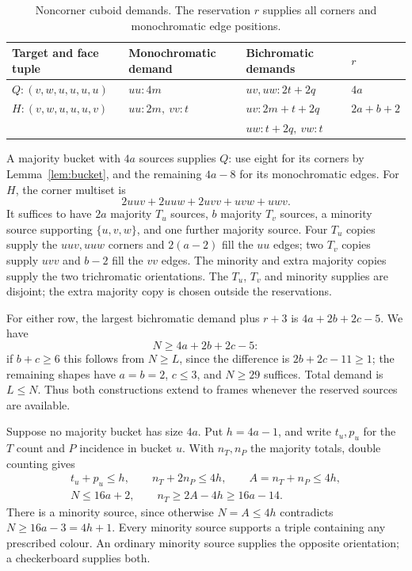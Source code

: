 \begin{table}[ht]
\centering
\small
\begin{tabular}{llll}
\toprule
Target and face tuple & Monochromatic demand & Bichromatic demands & $r$\\
\midrule
$Q:(v,w,u,u,u,u)$ & $uu:4m$ & $uv,uw:2t+2q$ & $4a$\\
$H:(v,w,u,u,u,v)$ & $uu:2m,\ vv:t$ &
$uv:2m+t+2q$ & $2a+b+2$\\
 & & $uw:t+2q,\ vw:t$ & \\
\bottomrule
\end{tabular}
\caption{Noncorner cuboid demands. The reservation $r$ supplies all
corners and monochromatic edge positions.}
\label{tab:cuboid-demands}
\end{table}

A majority bucket with $4a$ sources supplies $Q$: use eight for its
corners by Lemma~\ref{lem:bucket}, and the remaining $4a-8$ for its
monochromatic edges.
For $H$, the corner multiset is
\[
 2uuv+2uuw+2uvv+uvw+uwv.
\]
It suffices to have $2a$ majority $T_u$ sources, $b$ majority $T_v$ sources,
a minority source supporting $\{u,v,w\}$, and one further majority source.
Four $T_u$ copies supply the $uuv,uuw$ corners and $2(a-2)$ fill the $uu$
edges; two $T_v$ copies supply $uvv$ and $b-2$ fill the $vv$ edges.
The minority and extra majority copies supply the two trichromatic
orientations. The $T_u$, $T_v$ and minority supplies are disjoint; the
extra majority copy is chosen outside the reservations.

For either row, the largest bichromatic demand plus $r+3$ is
$4a+2b+2c-5$. We have
\begin{equation}\label{eq:cuboid-budget}
 N\ge4a+2b+2c-5:
\end{equation}
if $b+c\ge6$ this follows from $N\ge L$, since the difference is
$2b+2c-11\ge1$; the remaining shapes have $a=b=2$, $c\le3$, and
$N\ge29$ suffices. Total demand is $L\le N$. Thus both constructions
extend to frames whenever the reserved sources are available.

Suppose no majority bucket has size $4a$. Put $h=4a-1$, and write
$t_u,p_u$ for the $T$ count and $P$ incidence in bucket $u$.
With $n_T,n_P$ the majority totals, double counting gives
\begin{equation}\label{eq:cuboid-buckets}
\begin{gathered}
 t_u+p_u\le h,\qquad n_T+2n_P\le4h,\qquad A=n_T+n_P\le4h,\\
 N\le16a+2,\qquad n_T\ge2A-4h\ge16a-14.
\end{gathered}
\end{equation}
There is a minority source, since otherwise $N=A\le4h$ contradicts
$N\ge16a-3=4h+1$. Every minority source supports a triple containing any
prescribed colour. An ordinary minority source supplies the opposite
orientation; a checkerboard supplies both.

